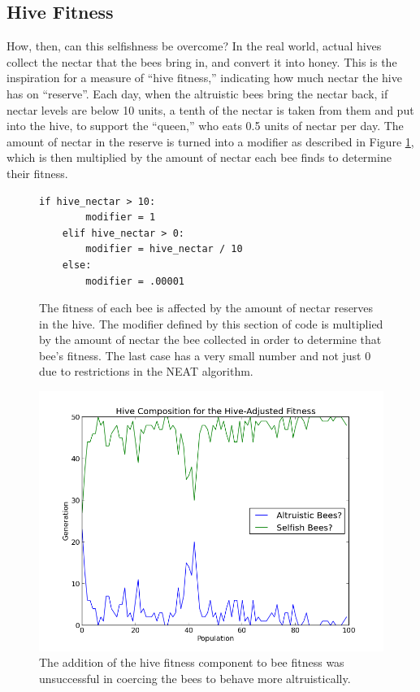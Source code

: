 \documentclass[twoside]{article}
\begin{document}
\begin{multicols}{2}
		\subsection{Hive Fitness} %
		\label{sub:hive_fitness}
				How, then, can this selfishness be overcome? In the real world, actual hives collect the nectar that the bees bring in, and convert it into honey. This is the inspiration for a measure of ``hive fitness,'' indicating how much nectar the hive has on ``reserve''. Each day, when the altruistic bees bring the nectar back, if nectar levels are below 10 units, a tenth of the nectar is taken from them and put into the hive, to support the ``queen,'' who eats 0.5 units of nectar per day. The amount of nectar in the reserve is turned into a modifier as described in Figure \ref{fig:modifier_algorithm}, which is then multiplied by the amount of nectar each bee finds to determine their fitness.

			\begin{figure}[H]
				\begin{Verbatim}[frame=single]
    if hive_nectar > 10:
        modifier = 1
    elif hive_nectar > 0:
        modifier = hive_nectar / 10
    else:
        modifier = .00001 
				\end{Verbatim}
				\caption{The fitness of each bee is affected by the amount of nectar reserves in the hive. The modifier defined by this section of code is multiplied by the amount of nectar the bee collected in order to determine that bee's fitness. The last case has a very small number and not just 0 due to restrictions in the NEAT algorithm.}
				\label{fig:modifier_algorithm}
			\end{figure}

			\begin{figure}[H]
				\begin{center}
					\includegraphics[width=.5\textwidth]{results/hive_fitness_comp.png}
				\end{center}
				\caption{The addition of the hive fitness component to bee fitness was unsuccessful in coercing the bees to behave more altruistically.}
				\label{fig:hive_fitness_composition}
			\end{figure}


\end{multicols}
\end{document}
